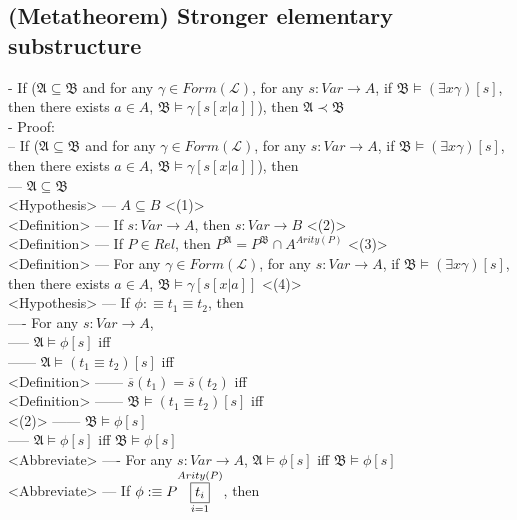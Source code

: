 \documentclass{book}
\newcommand{\is}{:\equiv}
\newcommand{\means}[2]{#1^{#2}}
\newcommand{\extend}[1]{\overline{#1}}
\newcommand{\vdc}[3]{\underset{#2}{\overset{#3}{\fbox{$#1$}}}}
\begin{document}
\subsection{(Metatheorem) Stronger elementary substructure} %
	- If ($\mathfrak{A} \subseteq \mathfrak{B}$ and for any $\gamma \in Form(\mathcal{L})$, for any $s: Var \rightarrow A$, if $\mathfrak{B} \vDash (\exists x \gamma)[s]$, then there exists $a \in A$, $\mathfrak{B} \vDash \gamma[s[x|a]]$), then $\mathfrak{A} \prec \mathfrak{B}$ \\
	- Proof: \\
		-- If ($\mathfrak{A} \subseteq \mathfrak{B}$ and for any $\gamma \in Form(\mathcal{L})$, for any $s: Var \rightarrow A$, if $\mathfrak{B} \vDash (\exists x \gamma)[s]$, then there exists $a \in A$, $\mathfrak{B} \vDash \gamma[s[x|a]]$), then \\
			--- $\mathfrak{A} \subseteq \mathfrak{B}$ \\ <Hypothesis>
			--- $A \subseteq B$ <(1)> \\ <Definition>
			--- If $s: Var \rightarrow A$, then $s: Var \rightarrow B$ <(2)> \\ <Definition>
			--- If $P \in Rel$, then $\means{P}{\mathfrak{A}} = \means{P}{\mathfrak{B}} \cap A^{Arity(P)}$ <(3)> \\ <Definition>
			--- For any $\gamma \in Form(\mathcal{L})$, for any $s: Var \rightarrow A$, if $\mathfrak{B} \vDash (\exists x \gamma)[s]$, then there exists $a \in A$, $\mathfrak{B} \vDash \gamma[s[x|a]]$ <(4)> \\ <Hypothesis>
			--- If $\phi \is t_1 \equiv t_2$, then \\
				---- For any $s: Var \rightarrow A$, \\
					----- $\mathfrak{A} \vDash \phi[s]$ iff \\
						------ $\mathfrak{A} \vDash (t_1 \equiv t_2)[s]$ iff \\ <Definition>
						------ $\extend{s}(t_1) = \extend{s}(t_2)$ iff \\ <Definition>
						------ $\mathfrak{B} \vDash (t_1 \equiv t_2)[s]$ iff \\ <(2)>
						------ $\mathfrak{B} \vDash \phi[s]$ \\
					----- $\mathfrak{A} \vDash \phi[s]$ iff $\mathfrak{B} \vDash \phi[s]$ \\ <Abbreviate>
				---- For any $s: Var \rightarrow A$, $\mathfrak{A} \vDash \phi[s]$ iff $\mathfrak{B} \vDash \phi[s]$ \\ <Abbreviate>
			--- If $\phi \is P \vdc{t_i}{i=1}{Arity(P)}$, then \\
\end{document}
